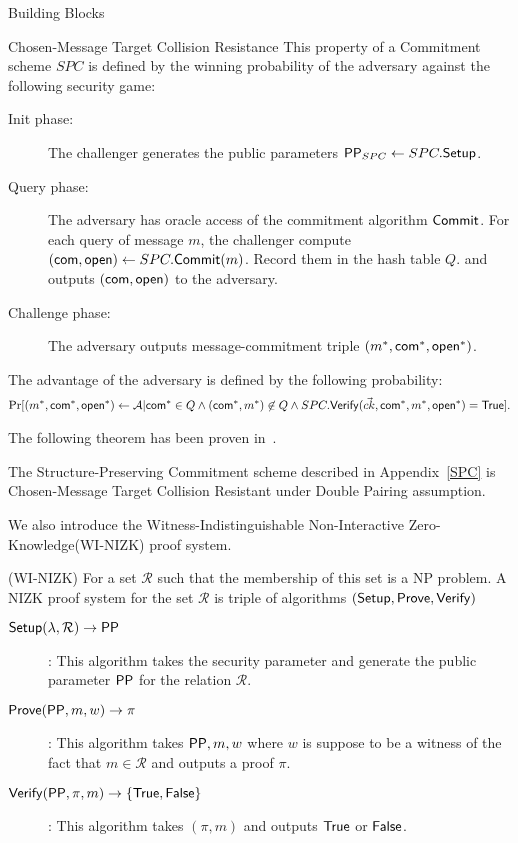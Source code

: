 \begin{subsection}{Building Blocks}
  
  \begin{myDef}{Chosen-Message Target Collision Resistance} This property of a Commitment scheme $SPC$ is defined by the winning probability of the adversary against the following security game:
    \begin{description}
    \item[Init phase:] The challenger generates the public parameters $\mathsf{PP}_{SPC} \gets SPC.{\mathsf{Setup}}$.
    \item[Query phase:] The adversary has oracle access of the commitment algorithm ${\mathsf{Commit}}$. For each query of message $m$, the challenger compute $(\mathsf{com}, \mathsf{open}) \gets SPC.{\mathsf{Commit}}(m)$. Record them in the hash table $Q$. and outputs $(\mathsf{com}, \mathsf{open})$ to the adversary.
    \item[Challenge phase:] The adversary outputs message-commitment triple $(m^*, \mathsf{com}^*, \mathsf{open}^*)$.
    \end{description}
    The advantage of the adversary is defined by the following probability:
    \begin{align*}
      \operatorname{Pr}[(m^*, \mathsf{com}^*, \mathsf{open}^*) \gets \mathcal{A} | \mathsf{com}^* \in Q \wedge (\mathsf{com}^*, m^*) \not \in Q \wedge SPC.{\mathsf{Verify}}(\vec{ck}, \mathsf{com}^*, m^*, \mathsf{open}^*) = \mathsf{True}].
    \end{align*}
  \end{myDef}

  The following theorem has been proven in~\cite{DBLP:conf/eurocrypt/AbeKOT15}.

  \begin{myTh}
    The Structure-Preserving Commitment scheme described in Appendix~\ref{SPC} is Chosen-Message Target Collision Resistant under Double Pairing assumption.
  \end{myTh}




    We also introduce the Witness-Indistinguishable Non-Interactive Zero-Knowledge(WI-NIZK) proof system.
    \begin{myDef}{(WI-NIZK)} For a set $\mathcal{R}$ such that the membership of this set is a NP problem. A NIZK proof system for the set $\mathcal{R}$ is triple of algorithms $({\mathsf{Setup}}, {\mathsf{Prove}}, {\mathsf{Verify}})$
      \begin{description}
      \item[$\boldmath{{\mathsf{Setup}}(\lambda, \mathcal{R}) \to \mathsf{PP}}$]: This algorithm takes the security parameter and generate the public parameter $\mathsf{PP}$ for the relation $\mathcal{R}$. 
      \item[$\boldmath{{\mathsf{Prove}}(\mathsf{PP}, m, w) \to \pi}$]: This algorithm takes $\mathsf{PP}, m, w$ where $w$ is suppose to be a witness of the fact that $m \in \mathcal{R}$ and outputs a proof $\pi$. 
      \item[$\boldmath{{\mathsf{Verify}}(\mathsf{PP}, \pi, m) \to \{\mathsf{True}, \mathsf{False}\}}$]: This algorithm takes $(\pi, m)$ and outputs $\mathsf{True}$ or $\mathsf{False}$.
      \end{description}


\end{myDef}
\end{subsection}
